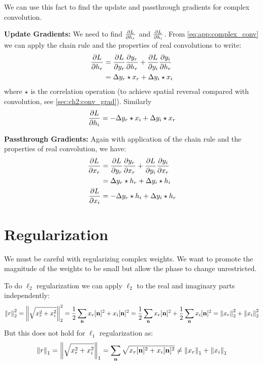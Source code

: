 We can use this fact to find the update and passthrough gradients for complex
convolution.

\textbf{Update Gradients:} We need to find $\frac{\partial L}{\partial h_r}$ and $\frac{\partial L}{\partial h_i}$.
From \eqref{eq:app:complex_conv} we can apply the chain rule and the properties
of real convolutions to write:
\begin{align}
  \frac{\partial L}{\partial h_r} &= \frac{\partial L}{\partial y_r}\frac{\partial y_r}{\partial h_r} + \frac{\partial L}{\partial y_i}\frac{\partial y_i}{\partial h_r} \\
                &= \Delta y_r \star x_r + \Delta y_i \star x_i
\end{align}
where $\star$ is the correlation operation (to achieve spatial reversal compared
with convolution, see \autoref{sec:ch2:conv_grad}).
Similarly 
\begin{equation}
  \frac{\partial L}{\partial h_i} = -\Delta y_r \star x_i + \Delta y_i \star x_r
\end{equation}

\textbf{Passthrough Gradients:} Again with application of the chain rule and the
properties of real convolution, we have:
\begin{align}
  \frac{\partial L}{\partial x_r} &= \frac{\partial L}{\partial y_r}\frac{\partial y_r}{\partial x_r} + \frac{\partial L}{\partial y_i}\frac{\partial y_i}{\partial x_r} \\
                &= \Delta y_r \star h_r + \Delta y_i \star h_i \\
  \frac{\partial L}{\partial x_i} &= -\Delta y_r \star h_i + \Delta y_i \star h_r
\end{align}

\section{Regularization}\label{sec:appE:complex_reg}
We must be careful with regularizing complex weights. We want to promote the
magnitude of the weights to be small but allow the phase to change unrestricted.

To do $\ell_2$ regularization we can apply $\ell_2$ to the real and imaginary parts
independently:
\begin{equation}
  {\left\lVert r \right\rVert}_{2}^2 = {\left\lVert \sqrt{x_r^2+x_i^2} \right\rVert}_{2}^2 = \frac{1}{2}\sum_{\mathbf{n}} x_r[\mathbf{n}]^2 + x_i[\mathbf{n}]^2 = 
  \frac{1}{2}\sum_{\mathbf{n}} x_r[\mathbf{n}]^2 + \frac{1}{2}\sum_{\mathbf{n}} x_i[\mathbf{n}]^2 = {\left\lVert x_r \right\rVert}_{2}^2 + {\left\lVert x_i \right\rVert}_{2}^2
\end{equation}
But this does not hold for $\ell_1$ regularization as:
\begin{equation}
  {\left\lVert r \right\rVert}_{1} = {\left\lVert \sqrt{x_r^2+x_i^2} \right\rVert}_{1} = \sum_{\mathbf{n}} \sqrt{x_r[\mathbf{n}]^2 + x_i[\mathbf{n}]^2} \neq {\left\lVert x_r \right\rVert}_{1} + {\left\lVert x_i \right\rVert}_{1}
\end{equation}

